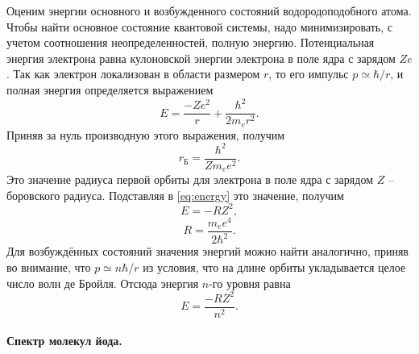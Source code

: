 \documentclass[a4paper]{article}
\begin{document}
	Оценим энергии основного и возбужденного состояний водородоподобного атома. Чтобы найти основное состояние квантовой системы, надо минимизировать, с учетом соотношения неопределенностей, полную энергию. Потенциальная энергия электрона равна кулоновской энергии электрона в поле ядра с зарядом $ Z e $. Так как электрон локализован в области размером $ r $, то его импульс $ p \simeq \hbar / r $, и полная энергия определяется выражением
	\begin{equation}\label{eq:energy}
		E = \dfrac{-Z e^2}{r}+\dfrac{\hbar^2}{2 m_e r^2}.
	\end{equation}
	Приняв за нуль производную этого выражения, получим
	\begin{equation*}\label{key}
		r_Б = \dfrac{\hbar^2}{Z m_e e^2}.
	\end{equation*}
	Это значение радиуса первой орбиты для электрона в поле ядра с зарядом $ Z $ -- боровского радиуса. Подставляя в \eqref{eq:energy} это значение, получим
	\begin{equation*}\label{key}
		E = -R Z^2,
	\end{equation*}
	\begin{equation}\label{key}
		R = \dfrac{m_e e^4}{2 \hbar^2}.
	\end{equation}
	Для возбуждённых состояний значения энергий можно найти аналогично, приняв во внимание, что $ p \simeq n \hbar / r $ из условия, что на длине орбиты укладывается целое число волн де Бройля. Отсюда энергия $ n $-го уровня равна 
	\begin{equation*}\label{key}
		E = \dfrac{-R Z^2}{n^2}.
	\end{equation*}
	
	\paragraph{Спектр молекул йода.}
	
\end{document}

